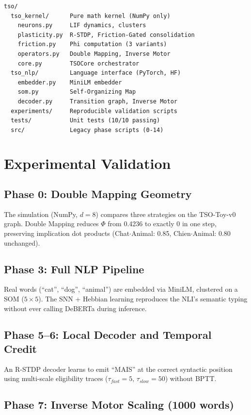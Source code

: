\documentclass{article}
\begin{document}
\begin{verbatim}
tso/
  tso_kernel/      Pure math kernel (NumPy only)
    neurons.py     LIF dynamics, clusters
    plasticity.py  R-STDP, Friction-Gated consolidation
    friction.py    Phi computation (3 variants)
    operators.py   Double Mapping, Inverse Motor
    core.py        TSOCore orchestrator
  tso_nlp/         Language interface (PyTorch, HF)
    embedder.py    MiniLM embedder
    som.py         Self-Organizing Map
    decoder.py     Transition graph, Inverse Motor
  experiments/     Reproducible validation scripts
  tests/           Unit tests (10/10 passing)
  src/             Legacy phase scripts (0-14)
\end{verbatim}

\section{Experimental Validation}

\subsection{Phase 0: Double Mapping Geometry}

The simulation (NumPy, $d=8$) compares three strategies on the TSO-Toy-v0 graph. Double Mapping reduces $\Phi$ from 0.4236 to exactly 0 in one step, preserving implication dot products (Chat$\cdot$Animal: 0.85, Chien$\cdot$Animal: 0.80 unchanged).

\subsection{Phase 3: Full NLP Pipeline}

Real words (``cat'', ``dog'', ``animal'') are embedded via MiniLM, clustered on a SOM ($5\times5$). The SNN + Hebbian learning reproduces the NLI's semantic typing without ever calling DeBERTa during inference.

\subsection{Phase 5--6: Local Decoder and Temporal Credit}

An R-STDP decoder learns to emit ``MAIS'' at the correct syntactic position using multi-scale eligibility traces ($\tau_{fast}=5$, $\tau_{slow}=50$) without BPTT.

\subsection{Phase 7: Inverse Motor Scaling (1000 words)}
\end{document}

